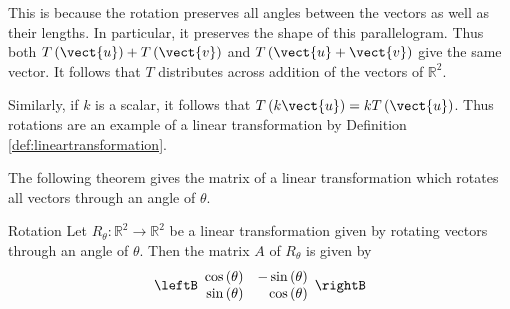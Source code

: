 This is because the rotation preserves all angles between the vectors
as well as their lengths. In particular, it preserves the shape of
this parallelogram. Thus both
$T\left(\vect{u}\right)+T\left(\vect{v}\right)$ and
$T\left(\vect{u}+\vect{v}\right)$ give the same vector. It follows
that $T$ distributes across addition of the vectors of
$\mathbb{R}^{2}$.

Similarly, if $k$ is a scalar, it follows that $T\left(k\vect{u}\right)=kT\left(\vect{u}\right)$.
Thus rotations are an example of a
linear transformation by Definition \ref{def:lineartransformation}.

The following theorem gives the matrix of a linear transformation which rotates all vectors through an angle of $\theta$. 

\begin{theorem}{Rotation}\label{thm:rotation}
Let $R_{\theta}: \mathbb{R}^2 \to \mathbb{R}^2$ be a linear transformation given by rotating vectors through an angle of $\theta$. Then the matrix $A$ of $R_{\theta}$ is given by 
\[
\leftB
\begin{array}{rr}
\cos \left( \theta \right) & -\sin \left( \theta \right) \\
\sin \left( \theta \right) & \cos \left( \theta \right)
\end{array}
\rightB
\]
\end{theorem}


